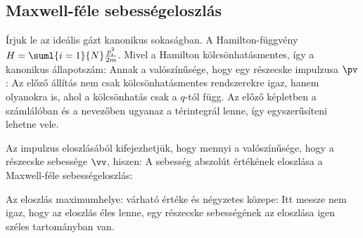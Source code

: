   \subsection{Maxwell-féle sebességeloszlás}
   
   Írjuk le az ideális gázt kanonikus sokaságban.
   A Hamilton-függvény $H=\suml{i=1}{N}\frac{p_i^2}{2m}$.
   Mivel a Hamilton kölcsönhatásmentes, így a kanonikus állapotszám:
   Annak a valószínűsége, hogy egy részecske impulzusa $\pv$:
   Az előző állítás nem csak kölcsönhatásmentes rendszerekre igaz, hanem olyanokra is, ahol a kölcsönhatás csak a $q$-tól függ.
   Az előző képletben a számlálóban és a nevezőben ugyanaz a térintegrál lenne, így egyszerűsíteni lehetne vele.
   
   Az impulzus eloszlásából kifejezhetjük, hogy mennyi a valószínűsége, hogy a részecske sebessége $\vv$, hiszen:
   A sebesség abszolút értékének eloszlása a Maxwell-féle sebességeloszlás:
   
   Az eloszlás maximumhelye:
   várható értéke és négyzetes közepe:
   Itt messze nem igaz, hogy az eloszlás éles lenne, egy részecske sebességének az eloszlása igen széles tartományban van. 
   
